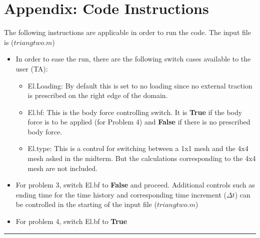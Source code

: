 \section*{Appendix: Code Instructions }
The following instructions are applicable in order to run the code. The input file is ($triangtwo.m$)
\begin{itemize}
\item In order to ease the run, there are the following switch cases available to the user (TA):
\begin{itemize}
\item El.Loading: By default this is set to no loading since no external traction is prescribed on the right edge of the domain. 
\item El.bf: This is the body force controlling switch. It is {\bf True} if the body force is to be applied (for Problem 4) and {\bf False} if there is no prescribed body force. 
\item El.type: This is a control for switching between a 1x1 mesh and the 4x4 mesh asked in the midterm. But the calculations corresponding to the 4x4 mesh are not included. 
\end{itemize}
\item For problem 3, switch El.bf to {\bf False} and proceed. Additional controls such as ending time for the time history and corresponding time increment ($\Delta t$) can be controlled in the starting of the input file ($triangtwo.m$)
\item For problem 4, switch El.bf to {\bf True}
\end{itemize}\hrule 
\newpage 
